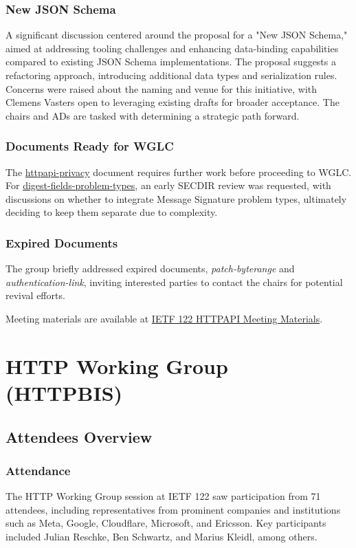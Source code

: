 \documentclass{article}
\begin{document}
\subsubsection{New JSON Schema}
A significant discussion centered around the proposal for a "New JSON Schema," aimed at addressing tooling challenges and enhancing data-binding capabilities compared to existing JSON Schema implementations. The proposal suggests a refactoring approach, introducing additional data types and serialization rules. Concerns were raised about the naming and venue for this initiative, with Clemens Vasters open to leveraging existing drafts for broader acceptance. The chairs and ADs are tasked with determining a strategic path forward.

\subsubsection{Documents Ready for WGLC}
The \href{https://datatracker.ietf.org/doc/html/draft-ietf-httpapi-httpapi-privacy}{httpapi-privacy} document requires further work before proceeding to WGLC. For \href{https://datatracker.ietf.org/doc/html/draft-ietf-httpapi-digest-fields-problem-types}{digest-fields-problem-types}, an early SECDIR review was requested, with discussions on whether to integrate Message Signature problem types, ultimately deciding to keep them separate due to complexity.

\subsubsection{Expired Documents}
The group briefly addressed expired documents, \textit{patch-byterange} and \textit{authentication-link}, inviting interested parties to contact the chairs for potential revival efforts.

Meeting materials are available at \href{https://www.ietf.org/proceedings/122/httpapi.html}{IETF 122 HTTPAPI Meeting Materials}.



\newpage

\section{HTTP Working Group (HTTPBIS)}

\subsection{Attendees Overview}
\subsubsection{Attendance}
The HTTP Working Group session at IETF 122 saw participation from 71 attendees, including representatives from prominent companies and institutions such as Meta, Google, Cloudflare, Microsoft, and Ericsson. Key participants included Julian Reschke, Ben Schwartz, and Marius Kleidl, among others.
\end{document}
